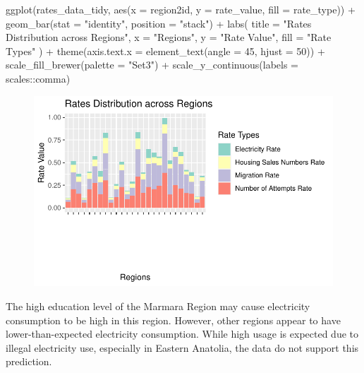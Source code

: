 \documentclass[
  11pt,
  a4paper,
  DIV=11,
  numbers=noendperiod]{scrartcl}
\newenvironment{Shaded}{\begin{snugshade}}{\end{snugshade}}
\newcommand{\AttributeTok}[1]{\textcolor[rgb]{0.40,0.45,0.13}{#1}}
\newcommand{\DecValTok}[1]{\textcolor[rgb]{0.68,0.00,0.00}{#1}}
\newcommand{\FunctionTok}[1]{\textcolor[rgb]{0.28,0.35,0.67}{#1}}
\newcommand{\NormalTok}[1]{\textcolor[rgb]{0.00,0.23,0.31}{#1}}
\newcommand{\SpecialCharTok}[1]{\textcolor[rgb]{0.37,0.37,0.37}{#1}}
\newcommand{\StringTok}[1]{\textcolor[rgb]{0.13,0.47,0.30}{#1}}
\begin{document}
\begin{Shaded}
\begin{Highlighting}[]
\FunctionTok{ggplot}\NormalTok{(rates\_data\_tidy, }\FunctionTok{aes}\NormalTok{(}\AttributeTok{x =}\NormalTok{ region2id, }\AttributeTok{y =}\NormalTok{ rate\_value, }\AttributeTok{fill =}\NormalTok{ rate\_type)) }\SpecialCharTok{+}
  \FunctionTok{geom\_bar}\NormalTok{(}\AttributeTok{stat =} \StringTok{"identity"}\NormalTok{, }\AttributeTok{position =} \StringTok{"stack"}\NormalTok{) }\SpecialCharTok{+}
  \FunctionTok{labs}\NormalTok{(}
    \AttributeTok{title =} \StringTok{"Rates Distribution across Regions"}\NormalTok{,}
    \AttributeTok{x =} \StringTok{"Regions"}\NormalTok{,}
    \AttributeTok{y =} \StringTok{"Rate Value"}\NormalTok{,}
    \AttributeTok{fill =} \StringTok{"Rate Types"}
\NormalTok{  ) }\SpecialCharTok{+}
  \FunctionTok{theme}\NormalTok{(}\AttributeTok{axis.text.x =} \FunctionTok{element\_text}\NormalTok{(}\AttributeTok{angle =} \DecValTok{45}\NormalTok{, }\AttributeTok{hjust =} \DecValTok{50}\NormalTok{)) }\SpecialCharTok{+}
  \FunctionTok{scale\_fill\_brewer}\NormalTok{(}\AttributeTok{palette =} \StringTok{"Set3"}\NormalTok{) }\SpecialCharTok{+}
  \FunctionTok{scale\_y\_continuous}\NormalTok{(}\AttributeTok{labels =}\NormalTok{ scales}\SpecialCharTok{::}\NormalTok{comma)}
\end{Highlighting}
\end{Shaded}

\begin{figure}[H]

{\centering \includegraphics{analysis_files/figure-pdf/unnamed-chunk-12-2.pdf}

}

\end{figure}

The high education level of the Marmara Region may cause electricity
consumption to be high in this region. However, other regions appear to
have lower-than-expected electricity consumption. While high usage is
expected due to illegal electricity use, especially in Eastern Anatolia,
the data do not support this prediction.
\end{document}
